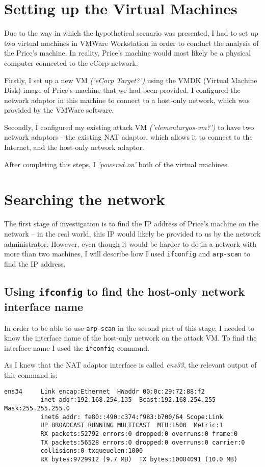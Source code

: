 \documentclass[12pt]{report}
\newcommand{\term}[1]{\colorbox{light-gray}{\texttt{#1}}}
\begin{document}
\section*{Setting up the Virtual Machines}
Due to the way in which the hypothetical scenario was presented, I had to set up two virtual machines in VMWare Workstation in order to conduct the analysis of the Price's machine. In reality, Price's machine would most likely be a physical computer connected to the eCorp network.

Firstly, I set up a new VM \textit{('eCorp Target?')} using the VMDK (Virtual Machine Disk) image of Price's machine that we had been provided. I configured the network adaptor in this machine to connect to a host-only network, which was provided by the VMWare software.

Secondly, I configured my existing attack VM \textit{('elementaryos-vm?')} to have two network adaptors - the existing NAT adaptor, which allows it to connect to the Internet, and the host-only network adaptor.

After completing this steps, I \textit{'powered on'} both of the virtual machines.


\section{Searching the network}
The first stage of investigation is to find the IP address of Price's machine on the network -- in the real world, this IP would likely be provided to us by the network administrator. However, even though it would be harder to do in a network with more than two machines, I will describe how I used \texttt{ifconfig} and \texttt{arp-scan} to find the IP address.

\subsection{Using \texttt{ifconfig} to find the host-only network interface name}
In order to be able to use \texttt{arp-scan} in the second part of this stage, I needed to know the interface name of the host-only network on the attack VM. To find the interface name I used the \term{ifconfig} command.

As I knew that the NAT adaptor interface is called \textit{ens33}, the relevant output of this command is:
\begin{Verbatim}[frame=leftline]
ens34     Link encap:Ethernet  HWaddr 00:0c:29:72:88:f2
          inet addr:192.168.254.135  Bcast:192.168.254.255  Mask:255.255.255.0
          inet6 addr: fe80::490:c374:f983:b700/64 Scope:Link
          UP BROADCAST RUNNING MULTICAST  MTU:1500  Metric:1
          RX packets:52792 errors:0 dropped:0 overruns:0 frame:0
          TX packets:56528 errors:0 dropped:0 overruns:0 carrier:0
          collisions:0 txqueuelen:1000
          RX bytes:9729912 (9.7 MB)  TX bytes:10084091 (10.0 MB)
\end{Verbatim}
\end{document}

